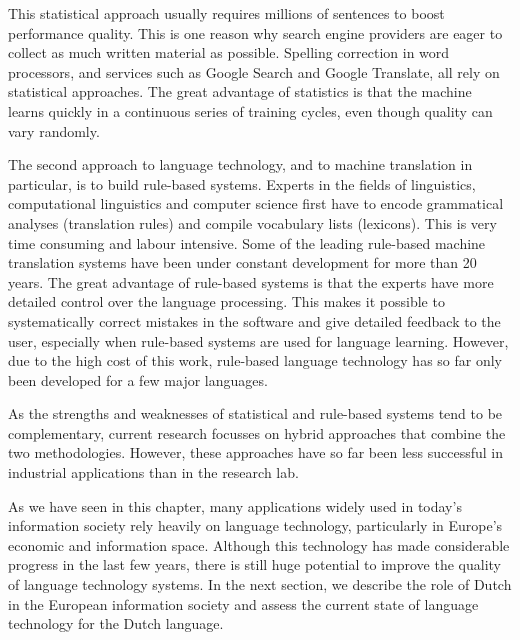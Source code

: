 \documentclass[]{../../metanetpaper}
\begin{document}
\begin{multicols}{2}
This statistical approach usually requires millions of sentences to boost performance quality. This is one reason why search engine providers are eager to collect as much written material as possible. Spelling correction in word processors, and services such as Google Search and Google Translate, all rely on statistical approaches. The great advantage of statistics is that the machine learns quickly in a continuous series of training cycles, even though quality can vary randomly.

The second approach to language technology, and to machine translation in particular, is to build rule-based systems. Experts in the fields of linguistics, computational linguistics and computer science first have to encode grammatical analyses (translation rules) and compile vocabulary lists (lexicons). This is very time consuming and labour intensive. Some of the leading rule-based machine translation systems have been under constant development for more than 20 years. The great advantage of rule-based systems is that the experts have more detailed control over the language processing. This makes it possible to systematically correct mistakes in the software and give detailed feedback to the user, especially when rule-based systems are used for language learning. However, due to the high cost of this work, rule-based language technology has so far only been developed for a few major languages.


As the strengths and weaknesses of statistical and rule-based systems tend to be complementary, current research focusses on hybrid approaches that combine the two methodologies. However, these approaches have so far been less successful in industrial applications than in the research lab.

As we have seen in this chapter, many applications widely used in today’s information society rely heavily on language technology, particularly in Europe’s economic and information space. Although this technology has made considerable progress in the last few years, there is still huge potential to improve the quality of language technology systems. In the next section, we describe the role of Dutch in the European information society and assess the current state of language technology for the Dutch language.
\end{multicols}

\clearpage
\end{document}

